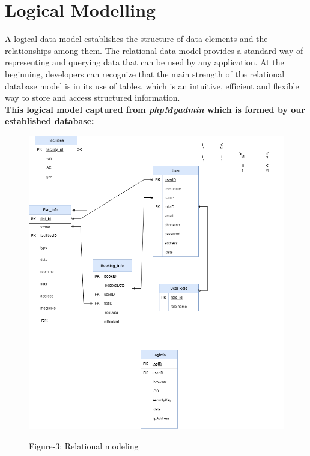 \section{Logical Modelling}\label{sec:lm}
A logical data model establishes the structure of data elements and the relationships among them. The relational data model provides a standard way of representing and querying data that can be used by any application. At the beginning, developers can recognize that the main strength of the relational database model is in its use of tables, which is an intuitive, efficient and flexible way to store and access structured information.\\
\noindent
\textbf{This logical model captured from \textit{phpMyadmin} which is formed by
our established database:}\\
\begin{figure}
\centering
 
    
\includegraphics[width=1\textwidth, inner]{images/RM.png}\\
\begin{center}
 Figure-3: Relational modeling
\end{center}
\end{figure}
\clearpage